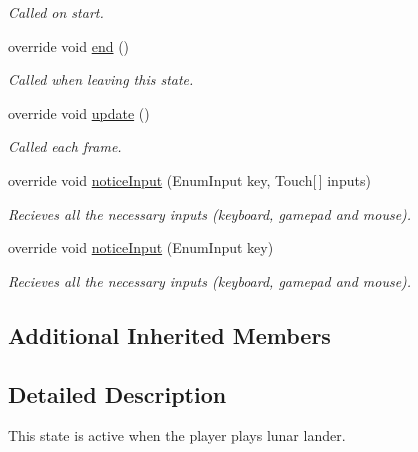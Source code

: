 \begin{DoxyCompactItemize}
\begin{DoxyCompactList}\small\item\em Called on start.\end{DoxyCompactList}\item 
override void \hyperlink{class_lunar_lander_state_a5b82951660f1ca37735c7f6ac5f29e2b}{end} ()
\begin{DoxyCompactList}\small\item\em Called when leaving this state.\end{DoxyCompactList}\item 
override void \hyperlink{class_lunar_lander_state_ac266f36c49863e79753fb87d2498f32d}{update} ()
\begin{DoxyCompactList}\small\item\em Called each frame.\end{DoxyCompactList}\item 
override void \hyperlink{class_lunar_lander_state_acb0c202b105ce74341f0026aea9e34b0}{notice\-Input} (Enum\-Input key, Touch\mbox{[}$\,$\mbox{]} inputs)
\begin{DoxyCompactList}\small\item\em Recieves all the necessary inputs (keyboard, gamepad and mouse).\end{DoxyCompactList}\item 
override void \hyperlink{class_lunar_lander_state_a22d43edbc96d9c4bd591bc119399a78e}{notice\-Input} (Enum\-Input key)
\begin{DoxyCompactList}\small\item\em Recieves all the necessary inputs (keyboard, gamepad and mouse).\end{DoxyCompactList}\end{DoxyCompactItemize}
\subsection*{Additional Inherited Members}


\subsection{Detailed Description}
This state is active when the player plays lunar lander.



